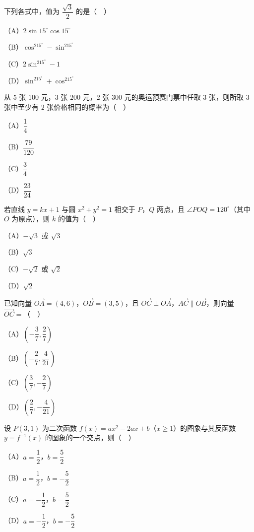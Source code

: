 \begin{question}
下列各式中，值为 $\dfrac{\sqrt3}{2}$ 的是（　）

（A）$2\sin15^\circ\cos15^\circ$

（B）$\cos^215^\circ-\sin^215^\circ$

（C）$2\sin^215^\circ-1$

（D）$\sin^215^\circ+\cos^215^\circ$

\end{question}
\begin{question}
从 $5$ 张 $100$ 元，$3$ 张 $200$ 元，$2$ 张 $300$ 元的奥运预赛门票中任取 $3$ 张，则所取 $3$ 张中至少有 $2$ 张价格相同的概率为（　）

（A）$\dfrac14$

（B）$\dfrac{79}{120}$

（C）$\dfrac34$

（D）$\dfrac{23}{24}$

\end{question}
\begin{question}
若直线 $y=kx+1$ 与圆 $x^2+y^2=1$ 相交于 $P$，$Q$ 两点，且 $\angle POQ=120^\circ$（其中 $O$ 为原点），则 $k$ 的值为（　）

（A）$-\sqrt3$ 或 $\sqrt3$

（B）$\sqrt3$

（C）$-\sqrt2$ 或 $\sqrt2$

（D）$\sqrt2$

\end{question}
\begin{question}
已知向量 $\overrightarrow{OA}=(4,6)$，$\overrightarrow{OB}=(3,5)$，且 $\overrightarrow{OC}\perp\overrightarrow{OA}$，$\overrightarrow{AC}\parallel\overrightarrow{OB}$，则向量 $\overrightarrow{OC}=$（　）

（A）$\left(-\dfrac37,\dfrac27\right)$

（B）$\left(-\dfrac27,\dfrac4{21}\right)$

（C）$\left(\dfrac37,-\dfrac27\right)$

（D）$\left(\dfrac27,-\dfrac4{21}\right)$

\end{question}
\begin{question}
设 $P(3,1)$ 为二次函数 $f(x)=ax^2-2ax+b$（$x\geqslant1$）的图象与其反函数 $y=f^{-1}(x)$ 的图象的一个交点，则（　）

（A）$a=\dfrac12$，$b=\dfrac52$

（B）$a=\dfrac12$，$b=-\dfrac52$

（C）$a=-\dfrac12$，$b=\dfrac52$

（D）$a=-\dfrac12$，$b=-\dfrac52$

\end{question}
